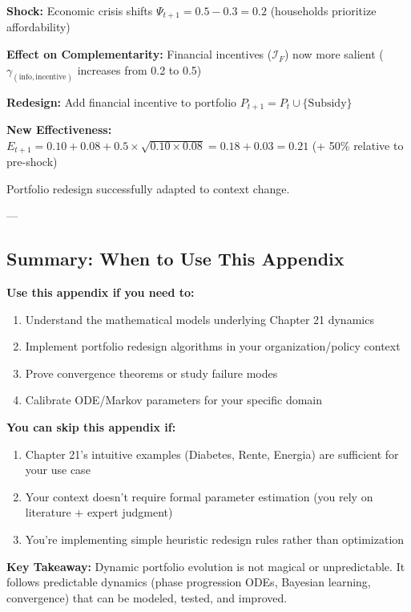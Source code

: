 \textbf{Shock:} Economic crisis shifts $\Psi_{t+1} = 0.5 - 0.3 = 0.2$ (households prioritize affordability)

\textbf{Effect on Complementarity:} Financial incentives ($\mathcal{I}_F$) now more salient ($\gamma_{(\text{info}, \text{incentive})} $ increases from 0.2 to 0.5)

\textbf{Redesign:} Add financial incentive to portfolio $P_{t+1} = P_t \cup \{\text{Subsidy}\}$

\textbf{New Effectiveness:} $E_{t+1} = 0.10 + 0.08 + 0.5 \times \sqrt{0.10 \times 0.08} = 0.18 + 0.03 = 0.21$ (+ 50\% relative to pre-shock)

Portfolio redesign successfully adapted to context change.

---

\subsection*{Summary: When to Use This Appendix}

\begin{tcolorbox}[colback=green!5!white, colframe=green!75!black, title=Appendix UNMAPPED_KKK Summary]

\textbf{Use this appendix if you need to:}
\begin{enumerate}
\item Understand the mathematical models underlying Chapter 21 dynamics
\item Implement portfolio redesign algorithms in your organization/policy context
\item Prove convergence theorems or study failure modes
\item Calibrate ODE/Markov parameters for your specific domain
\end{enumerate}

\textbf{You can skip this appendix if:}
\begin{enumerate}
\item Chapter 21's intuitive examples (Diabetes, Rente, Energia) are sufficient for your use case
\item Your context doesn't require formal parameter estimation (you rely on literature + expert judgment)
\item You're implementing simple heuristic redesign rules rather than optimization
\end{enumerate}

\textbf{Key Takeaway:} Dynamic portfolio evolution is not magical or unpredictable. It follows predictable dynamics (phase progression ODEs, Bayesian learning, convergence) that can be modeled, tested, and improved.

\end{tcolorbox}

